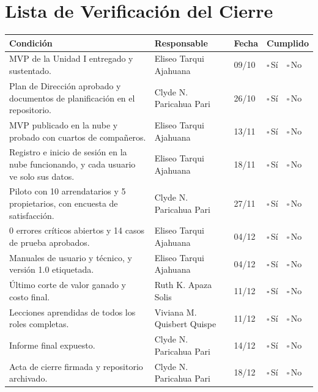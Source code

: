 \documentclass[11pt,a4paper]{article}
\newcommand{\marca}{{\Large$\square$}\,{\scriptsize Sí}\ \ {\Large$\square$}\,{\scriptsize No}}
\begin{document}
\section{Lista de Verificación del Cierre}
\newcommand{\ok}{\textcolor{Rama4}{\large$\checkmark$}}
\newcommand{\pend}{\textcolor{GrisOscuro}{\large$\square$}}
{\small
{}
\noindent\begin{tabularx}{\textwidth}{@{}L P{3.0cm} C{1.4cm} C{2.0cm}@{}}
\toprule
{}
\textbf{Condición} & \textbf{Responsable} & \textbf{Fecha} & \textbf{Cumplido} \\
\midrule
MVP de la Unidad I entregado y sustentado. & Eliseo Tarqui Ajahuana & 09/10 & \marca \\
Plan de Dirección aprobado y documentos de planificación en el repositorio. & Clyde N. Paricahua Pari & 26/10 & \marca \\
MVP publicado en la nube y probado con cuartos de compañeros. & Eliseo Tarqui Ajahuana & 13/11 & \marca \\
Registro e inicio de sesión en la nube funcionando, y cada usuario ve solo sus datos. & Eliseo Tarqui Ajahuana & 18/11 & \marca \\
Piloto con 10 arrendatarios y 5 propietarios, con encuesta de satisfacción. & Clyde N. Paricahua Pari & 27/11 & \marca \\
0 errores críticos abiertos y 14 casos de prueba aprobados. & Eliseo Tarqui Ajahuana & 04/12 & \marca \\
Manuales de usuario y técnico, y versión 1.0 etiquetada. & Eliseo Tarqui Ajahuana & 04/12 & \marca \\
Último corte de valor ganado y costo final. & Ruth K. Apaza Solis & 11/12 & \marca \\
Lecciones aprendidas de todos los roles completas. & Viviana M. Quisbert Quispe & 11/12 & \marca \\
Informe final expuesto. & Clyde N. Paricahua Pari & 14/12 & \marca \\
Acta de cierre firmada y repositorio archivado. & Clyde N. Paricahua Pari & 18/12 & \marca \\
\bottomrule
\end{tabularx}
}

\end{document}
